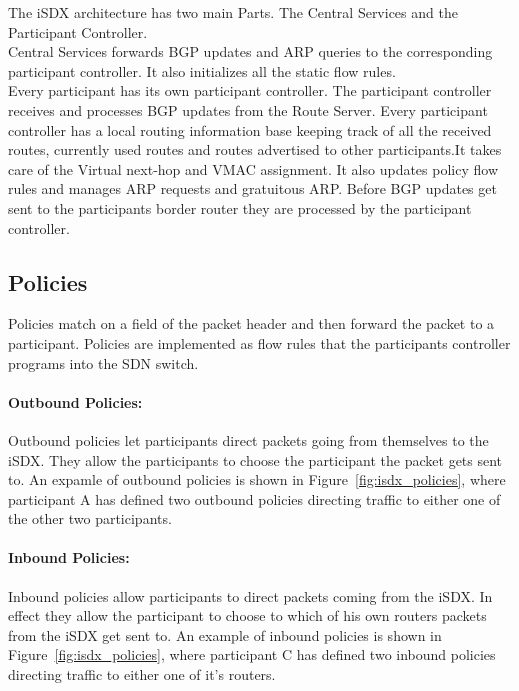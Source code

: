 The iSDX architecture has two main Parts. The Central Services and the Participant Controller. \\
Central Services forwards BGP updates and ARP queries to the corresponding participant controller. It also initializes all the static flow rules. \\
Every participant has its own participant controller. The participant controller receives and processes BGP updates from the Route Server. Every participant controller has a local routing information base keeping track of all the received routes, currently used routes and routes advertised to other participants.It takes care of the Virtual next-hop and VMAC assignment. It also updates policy flow rules and manages ARP requests and gratuitous ARP. Before BGP updates get sent to the participants border router they are processed by the participant controller.

\subsection{\label{chapter2:iSDX:policies}Policies}
Policies match on a field of the packet header and then forward the packet to a participant. Policies are implemented as flow rules that the participants controller programs into the SDN switch. 
\paragraph{\label{chapter2:iSDX:policies:outbound policies}Outbound Policies:}
Outbound policies let participants direct packets going from themselves to the iSDX. They allow the participants to choose the participant the packet gets sent to. An expamle of outbound policies is shown in Figure~\ref{fig:isdx_policies}, where participant A has defined two outbound policies directing traffic to either one of the other two participants.  

\paragraph{\label{chapter2:iSDX:policies:inbound policies}Inbound Policies:}
Inbound policies allow participants to direct packets coming from the iSDX. In effect they allow the participant to choose to which of his own routers packets from the iSDX get sent to. An example of inbound policies is shown in Figure~\ref{fig:isdx_policies}, where participant C has defined two inbound policies directing traffic to either one of it's routers. 

